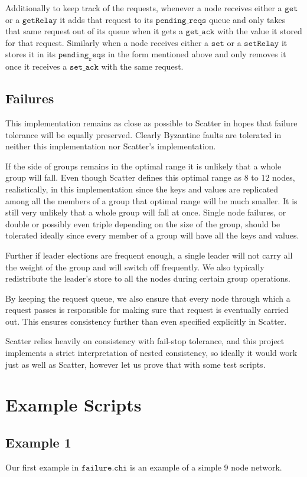 \documentclass{amsart}
\theoremstyle{definition}
\theoremstyle{remark}
\numberwithin{equation}{section}
\begin{document}
Additionally to keep track of the requests, whenever a node receives either a $\mathtt{get}$ or a $\mathtt{getRelay}$ it adds that request to its $\mathtt{pending\_reqs}$ queue and only takes that same request out of its queue when it gets a $\mathtt{get\_ack}$ with the value it stored for that request. Similarly when a node receives either a $\mathtt{set}$ or a $\mathtt{setRelay}$ it stores it in its $\mathtt{pending_reqs}$ in the form mentioned above and only removes it once it receives a $\mathtt{set\_ack}$ with the same request.
\subsection{Failures}
This implementation remains as close as possible to Scatter in hopes that failure tolerance will be equally preserved. Clearly Byzantine faults are tolerated in neither this implementation nor Scatter's implementation.

If the side of groups remains in the optimal range it is unlikely that a whole group will fall. Even though Scatter defines this optimal range as $8$ to $12$ nodes, realistically, in this implementation since the keys and values are replicated among all the members of a group that optimal range will be much smaller. It is still very unlikely that a whole group will fall at once. Single node failures, or double or possibly even triple depending on the size of the group, should be tolerated ideally since every member of a group will have all the keys and values. 

Further if leader elections are frequent enough, a single leader will not carry all the weight of the group and will switch off frequently. We also typically redistribute the leader's store to all the nodes during certain group operations.

By keeping the request queue, we also ensure that every node through which a request passes is responsible for making sure that request is eventually carried out. This ensures consistency further than even specified explicitly in Scatter.

Scatter relies heavily on consistency with fail-stop tolerance, and this project implements a strict interpretation of nested consistency, so ideally it would work just as well as Scatter, however let us prove that with some test scripts.
\section{Example Scripts}
\subsection{Example 1}
Our first example in $\mathtt{failure.chi}$ is an example of a simple 9 node network.
\end{document}
